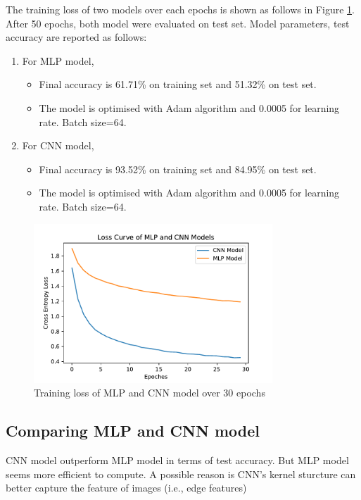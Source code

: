 \documentclass[12pt,letterpaper]{article}
\begin{document}
The training loss of two models over each epochs is shown as follows in Figure \ref{fig:loss_curve_mlp_cnn}.
After 50 epochs, both model were evaluated on test set. Model parameters, test accuracy are reported as follows:
\begin{enumerate}
	\item For MLP model, \begin{itemize}
		\item Final accuracy is 61.71\% on training set and 51.32\% on test set.
		\item The model is optimised with Adam algorithm and 0.0005 for learning rate. Batch size=64.
	\end{itemize}
	\item For CNN model, \begin{itemize}
		\item Final accuracy is 93.52\% on training set and 84.95\% on test set.
		\item The model is optimised with Adam algorithm and 0.0005 for learning rate. Batch size=64.
	\end{itemize}
	
\end{enumerate}

\begin{figure}[h]
	\centering
	\includegraphics[width=0.8\textwidth]{Loss_Curve_MLP_CNN}
	\caption{Training loss of MLP and CNN model over 30 epochs}
	\label{fig:loss_curve_mlp_cnn}
\end{figure}

\subsection*{Comparing MLP and CNN model}
CNN model outperform MLP model in terms of test accuracy. But MLP model seems more efficient to compute. A possible reason is CNN's kernel sturcture can better capture the feature of images (i.e., edge features)
\end{document}

